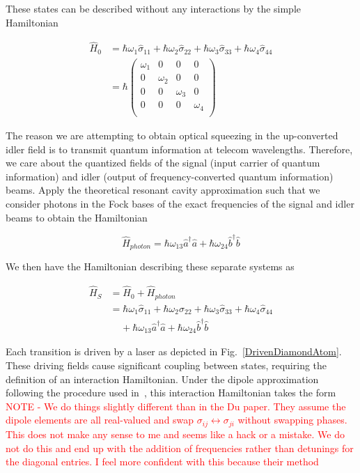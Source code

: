 \documentclass[aps,pra,showpacs,amsmath,amssymb,nofootinbib,longbibliography,superscriptaddress
]{revtex4-1}
\theoremstyle{definition}
\theoremstyle{remark}
\newcommand{\0}{\hat{0}}
\begin{document}
These states can be described without any interactions by the simple Hamiltonian

\begin{align}
    \hat{H}_0 &= \hbar \omega_1 \hat{\sigma}_{11} + \hbar \omega_2 \hat{\sigma}_{22} + \hbar \omega_3 \hat{\sigma}_{33} + \hbar \omega_4 \hat{\sigma}_{44}\\
    &= \hbar \left(\begin{array}{cccc}
        \omega_1 & 0 & 0 & 0\\
        0 & \omega_2 & 0 & 0\\
        0 & 0 & \omega_3 & 0\\
        0 & 0 & 0 & \omega_4\\
    \end{array}\right)
\end{align}


The reason we are attempting to obtain optical squeezing in the up-converted idler field is to transmit quantum information at telecom wavelengths. Therefore, we care about the quantized fields of the signal (input carrier of quantum information) and idler (output of frequency-converted quantum information) beams. Apply the theoretical resonant cavity approximation such that we consider photons in the Fock bases of the exact frequencies of the signal and idler beams to obtain the Hamiltonian

\begin{equation}
    \hat{H}_{photon} = \hbar \omega_{13} \hat{a}^{\dagger} \hat{a} + \hbar \omega_{24} \hat{b}^{\dagger} \hat{b}
\end{equation}

We then have the Hamiltonian describing these separate systems as


\begin{align}
    \hat{H}_S &= \hat{H}_0 + \hat{H}_{photon}\\
    &= \hbar \omega_1 \hat{\sigma}_{11} + \hbar \omega_2 \hat{\sigma}_{22} + \hbar \omega_3 \hat{\sigma}_{33} + \hbar \omega_4 \hat{\sigma}_{44}\nonumber \\
    &\;\;\;\;+ \hbar \omega_{13} \hat{a}^{\dagger} \hat{a} + \hbar \omega_{24} \hat{b}^{\dagger} \hat{b}
\end{align}


Each transition is driven by a laser as depicted in Fig.~\ref{DrivenDiamondAtom}. These driving fields cause significant coupling between states, requiring the definition of an interaction Hamiltonian. Under the dipole approximation following the procedure used in~\cite{QuantumInternet}, this interaction Hamiltonian takes the form  \textcolor{red}{NOTE - We do things slightly different than in the Du paper. They assume the dipole elements are all real-valued and swap $\sigma_{ij} \leftrightarrow \sigma_{ji}$ without swapping phases. This does not make any sense to me and seems like a hack or a mistake. We do not do this and end up with the addition of frequencies rather than detunings for the diagonal entries. I feel more confident with this because their method }
\end{document}
